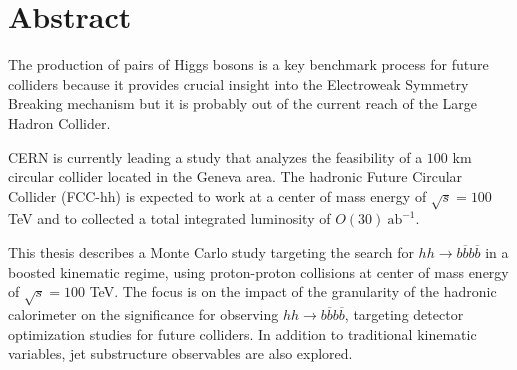 
\section*{Abstract}


%

The production of pairs of Higgs bosons is a key benchmark process for future colliders because it provides crucial insight into the Electroweak Symmetry Breaking mechanism but it is probably out of the current reach of the Large Hadron Collider.

CERN is currently leading a study that analyzes the feasibility of a $100$ km circular collider located in the Geneva area. The hadronic Future Circular Collider (FCC-hh) is expected to work at a center of mass energy of $\sqrt{s}=100$ TeV and to collected a total integrated luminosity of $O(30)~\text{ab}^{-1}$.

This thesis describes a Monte Carlo study targeting the search for $hh\rightarrow b\overline{b}b\overline{b}$ in a boosted kinematic regime, using proton-proton collisions at center of mass energy of $\sqrt{s}=100$ TeV. The focus is on the impact of the granularity of the hadronic calorimeter on the significance for observing $hh\rightarrow b\overline{b}b\overline{b}$, targeting detector optimization studies for future colliders. In addition to traditional kinematic variables, jet substructure observables are also explored.


